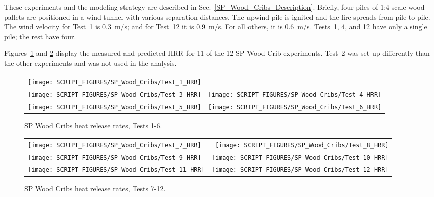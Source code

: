 These experiments and the modeling strategy are described in Sec.~\ref{SP_Wood_Cribs_Description}. Briefly, four piles of 1:4 scale wood pallets are positioned in a wind tunnel with various separation distances. The upwind pile is ignited and the fire spreads from pile to pile. The wind velocity for Test~1 is 0.3~m/s; and for Test~12 it is 0.9~m/s. For all others, it is 0.6~m/s. Tests~1, 4, and 12 have only a single pile; the rest have four.

Figures~\ref{SP_Wood_Cribs_HRR_1} and \ref{SP_Wood_Cribs_HRR_2} display the measured and predicted HRR for 11 of the 12 SP Wood Crib experiments. Test~2 was set up differently than the other experiments and was not used in the analysis.

\begin{figure}[!ht]
\begin{tabular*}{\textwidth}{l@{\extracolsep{\fill}}r}
\texttt{[image: SCRIPT\_FIGURES/SP\_Wood\_Cribs/Test\_1\_HRR]} &
 \\
\texttt{[image: SCRIPT\_FIGURES/SP\_Wood\_Cribs/Test\_3\_HRR]} &
\texttt{[image: SCRIPT\_FIGURES/SP\_Wood\_Cribs/Test\_4\_HRR]} \\
\texttt{[image: SCRIPT\_FIGURES/SP\_Wood\_Cribs/Test\_5\_HRR]} &
\texttt{[image: SCRIPT\_FIGURES/SP\_Wood\_Cribs/Test\_6\_HRR]}
\end{tabular*}
\caption[SP Wood Cribs heat release rates, Tests 1-6]{SP Wood Cribs heat release rates, Tests 1-6.}
\label{SP_Wood_Cribs_HRR_1}
\end{figure}

\begin{figure}[p]
\begin{tabular*}{\textwidth}{l@{\extracolsep{\fill}}r}
\texttt{[image: SCRIPT\_FIGURES/SP\_Wood\_Cribs/Test\_7\_HRR]} &
\texttt{[image: SCRIPT\_FIGURES/SP\_Wood\_Cribs/Test\_8\_HRR]} \\
\texttt{[image: SCRIPT\_FIGURES/SP\_Wood\_Cribs/Test\_9\_HRR]} &
\texttt{[image: SCRIPT\_FIGURES/SP\_Wood\_Cribs/Test\_10\_HRR]} \\
\texttt{[image: SCRIPT\_FIGURES/SP\_Wood\_Cribs/Test\_11\_HRR]} &
\texttt{[image: SCRIPT\_FIGURES/SP\_Wood\_Cribs/Test\_12\_HRR]}
\end{tabular*}
\caption[SP Wood Cribs heat release rates, Tests 7-12]{SP Wood Cribs heat release rates, Tests 7-12.}
\label{SP_Wood_Cribs_HRR_2}
\end{figure}


